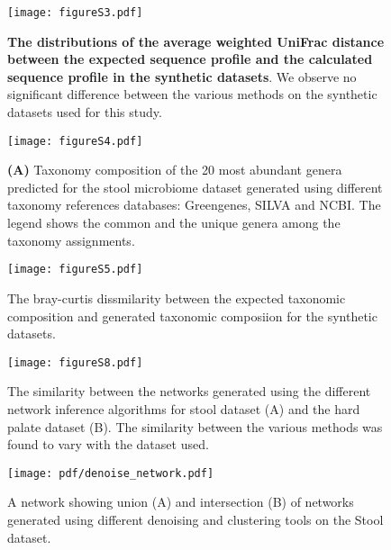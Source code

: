   \begin{figure}[h]
    \centering
    \texttt{[image: figureS3.pdf]}
    \caption{
      \textbf{The distributions of the average weighted UniFrac distance between the expected sequence profile and the calculated sequence profile in the synthetic datasets}.
      We observe no significant difference between the various methods on the synthetic datasets used for this study.
    }
    \label{fig:figureS3}
  \end{figure}


  \begin{figure}[h]
    \centering
    \texttt{[image: figureS4.pdf]}
    \caption{
      \textbf{(A)} Taxonomy composition of the 20 most abundant genera predicted for the stool microbiome dataset generated using different taxonomy references databases: Greengenes, SILVA and NCBI.
      The legend shows the common and the unique genera among the taxonomy assignments.
  }
    \label{fig:figureS4}
  \end{figure}

  \begin{figure}[h]
    \centering
    \texttt{[image: figureS5.pdf]}
    \caption{
      The bray-curtis dissmilarity between the expected taxonomic composition and generated taxonomic composiion for the synthetic datasets.
  }
  \label{fig:figureS5}
  \end{figure}


  \begin{figure}[h]
    \centering
    \texttt{[image: figureS8.pdf]}
    \caption{
      The similarity between the networks generated using the different network inference algorithms for stool dataset (A) and the hard palate dataset (B).
      The similarity between the various methods was found to vary with the dataset used.
  }
    \label{fig:figureS8}
  \end{figure}

  \begin{figure}[h]
    \centering
    \texttt{[image: pdf/denoise\_network.pdf]}
    \caption{A network showing union (A) and intersection (B) of networks generated using different denoising and clustering tools on the Stool dataset.}
    \label{fig:figureS5}
  \end{figure}
